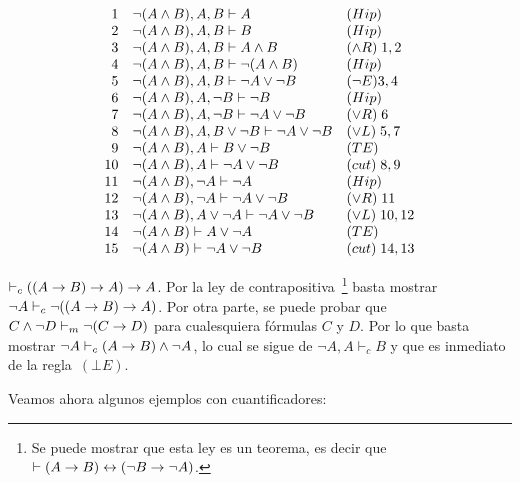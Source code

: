 \documentclass[11pt,letterpaper]{article}
\begin{document}
\[
\ba{rll}
1 & \neg(A\land B), A,B\vdash A & (Hip)\\
2 & \neg(A\land B), A,B\vdash B & (Hip)\\
3 & \neg(A\land B), A,B\vdash A\land B & (\land R)\;1,2\\
4 & \neg(A\land B), A,B\vdash \neg(A\land B) & (Hip)\\
5 & \neg(A\land B), A,B\vdash \neg A\lor\neg B & (\lnot E )3,4\;\\
6 & \neg(A\land B), A,\neg B\vdash \neg B & (Hip)\\
7 & \neg(A\land B), A,\neg B\vdash \neg A\lor\neg B & (\lor R)\; 6 \\
8 & \neg(A\land B), A,B\lor\neg B\vdash \neg A\lor\neg B & (\lor L)\; 5,7 \\
9 & \neg(A\land B), A\vdash B\lor\neg B & (TE)\\
10 & \neg(A\land B), A\vdash \neg A\lor\neg B & (cut)\; 8,9 \\
11 & \neg(A\land B), \neg A\vdash \neg A & (Hip)\\
12 & \neg(A\land B), \neg A \vdash \neg A\lor\neg B & (\lor R)\; 11 \\
13 & \neg(A\land B), A\lor \neg A \vdash \neg A\lor\neg B & (\lor L)\; 10,12\\
14 & \neg(A\land B)\vdash A\lor \neg A & (TE)\\
15 & \neg(A\land B)\vdash \neg A\lor\neg B & (cut)\; 14,13\\
\ea
\]

\item $\vdash_c ((A\imp B)\imp A)\imp A$. Por la ley de 
contrapositiva~\footnote{Se puede mostrar que esta ley es un teorema, es decir 
que $\vdash (A\imp B) \iff (\lnot B\imp \lnot A)$.} basta 
mostrar  $\neg A\vdash_c \neg((A\imp B)\imp A)$. Por otra parte, se puede
probar que $C\land\neg D\vdash_m \neg (C\imp D)$ para cualesquiera f\'ormulas 
$C$ y $D$.
Por lo que basta mostrar $\neg A\vdash_c (A\imp B)\land\neg A$, lo 
cual se sigue de $\neg A, A\vdash_c B$ y que es inmediato de la 
regla~$(\bot E)$.

\ei


Veamos ahora algunos ejemplos con cuantificadores:
\end{document}
